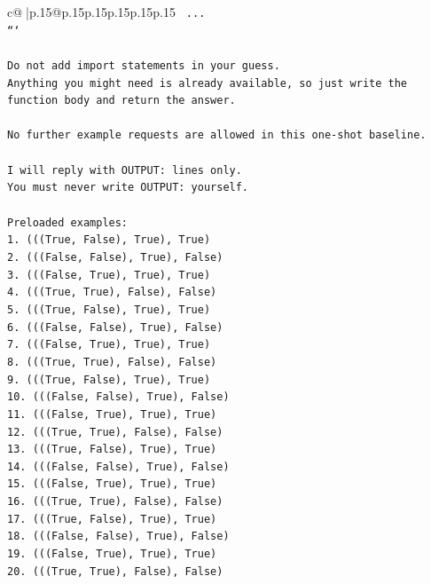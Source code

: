 \documentclass{article}
\begin{document}
{\begin{supertabular}{c@{$\;$}|p{.15\linewidth}@{}p{.15\linewidth}p{.15\linewidth}p{.15\linewidth}p{.15\linewidth}p{.15\linewidth}}
{{{\texttt{    ...} \\
\texttt{```} \\
\\ 
\texttt{Do not add import statements in your guess.} \\
\texttt{Anything you might need is already available, so just write the function body and return the answer.} \\
\\ 
\texttt{No further example requests are allowed in this one{-}shot baseline.} \\
\\ 
\texttt{I will reply with OUTPUT: lines only.} \\
\texttt{You must never write OUTPUT: yourself.} \\
\\ 
\texttt{Preloaded examples:} \\
\texttt{1. (((True, False), True), True)} \\
\texttt{2. (((False, False), True), False)} \\
\texttt{3. (((False, True), True), True)} \\
\texttt{4. (((True, True), False), False)} \\
\texttt{5. (((True, False), True), True)} \\
\texttt{6. (((False, False), True), False)} \\
\texttt{7. (((False, True), True), True)} \\
\texttt{8. (((True, True), False), False)} \\
\texttt{9. (((True, False), True), True)} \\
\texttt{10. (((False, False), True), False)} \\
\texttt{11. (((False, True), True), True)} \\
\texttt{12. (((True, True), False), False)} \\
\texttt{13. (((True, False), True), True)} \\
\texttt{14. (((False, False), True), False)} \\
\texttt{15. (((False, True), True), True)} \\
\texttt{16. (((True, True), False), False)} \\
\texttt{17. (((True, False), True), True)} \\
\texttt{18. (((False, False), True), False)} \\
\texttt{19. (((False, True), True), True)} \\
\texttt{20. (((True, True), False), False)} \\
}}}
\end{supertabular}}
\end{document}
